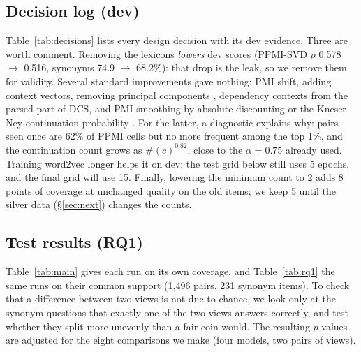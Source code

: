 \documentclass[11pt]{article}
\begin{document}
\subsection{Decision log (dev)}\label{sec:decisions}
Table~\ref{tab:decisions} lists every design decision with its dev
evidence. Three are worth comment. Removing the lexicons \emph{lowers} dev
scores (PPMI-SVD $\rho$ 0.578 $\to$ 0.516, synonyms 74.9 $\to$ 68.2\%): that
drop is the leak, so we remove them for validity. Several standard
improvements gave nothing: PMI shift, adding context vectors, removing
principal components \citep{mu2018allbutthetop}, dependency contexts from the
parsed part of DCS, and PMI smoothing by absolute discounting or the
Kneser--Ney continuation probability \citep{kneser1995improved}. For the
latter, a diagnostic explains why: pairs seen once are 62\% of PPMI cells
but no more frequent among the top 1\%, and the continuation count grows as
$\#(c)^{0.82}$, close to the $\alpha=0.75$ already used. Training word2vec longer helps it on dev; the test grid below still uses
5 epochs, and the final grid will use 15. Finally, lowering the minimum
count to 2 adds 8 points of coverage at unchanged quality on
the old items; we keep 5 until the silver data (\S\ref{sec:next}) changes
the counts.

\begin{table}[t]\centering\small

\caption{Decision log. Dev data, options compared on their common support
($\rho$ / synonym accuracy). Lexicon and profile rows: $d=300$ without
respelling; settings, technique, word2vec, smoothing and minimum-count rows:
$d=300$; others: the main setting.}
\label{tab:decisions}
\end{table}

\subsection{Test results (RQ1)}
Table~\ref{tab:main} gives each run on its own coverage, and
Table~\ref{tab:rq1} the same runs on their common support (1,496 pairs, 231
synonym items). To check that a difference between two views is not due to
chance, we look only at the synonym questions that exactly one of the two
views answers correctly, and test whether they split more unevenly than a
fair coin would. The resulting $p$-values are adjusted for the eight
comparisons we make (four models, two pairs of views).

\begin{table}[t]\centering\small
\setlength{\tabcolsep}{4.5pt}

\caption{Test results (cleaned benchmark), each run on its own coverage
(\%). Relatedness: Spearman $\rho$, AUC same-synset vs.\ unrelated
(AUC$_{20}$) and same-varga vs.\ unrelated (AUC$_{10}$), 3-way macro-F1 with
dev-tuned thresholds. Synonyms: accuracy (chance 25\%). Cat.: EvalSan
semantic categorisation; Varga: $k$-means ($k=22$) against the Amarakośa
vargas (permutation null 0.018). word2vec and FastText are mean-centred
(chosen on dev).}
\label{tab:main}
\end{table}
\end{document}
